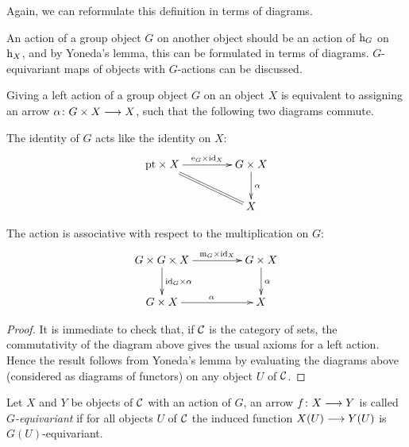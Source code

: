 \begin{2   CONTRAVARIANT FUNCTORS}
\begin{2.2 Group objects}
Again, we can reformulate this definition in terms of diagrams.
\begin{shaded}
An action of a group object $G$ on another object should be an action of $\mathrm{h}_G$ on $\mathrm{h}_X$, and by Yoneda's lemma, this can be formulated in terms of diagrams. $G$-equivariant maps of objects with $G$-actions can be discussed.
\end{shaded}

\begin{proposition}\label{prop:diagram-action}
Giving a left action of a group object $G$ on an object $X$ is equivalent to assigning an arrow $\alpha \colon G \times X \arr X$, such that the following two diagrams commute.

\begin{enumeratei}

\item The identity of $G$ acts like the identity on $X$:
   \[
   \xymatrix@C+20pt{
   {}\pt \times X\ar@{=}[rd]\ar[r]^-{\iden_G \times \id_X}&
   G\times X\ar[d]^{\alpha}\\
   &X
   }
   \]

\item The action is associative with respect to the multiplication
on $G$:
   \[
   \xymatrix@C+20pt{
   G \times G \times X
			\ar[r]^-{\mul_G \times\id_X}\ar[d]^{\id_G \times\alpha}&
   G \times X\ar[d]^{\alpha}\\
   G \times X\ar[r]^{\alpha}&
   X
   }
   \]

\end{enumeratei}
\end{proposition}

\begin{proof}
It is immediate to check that, if $\mathcal{C}$ is the category of sets, the commutativity of the diagram above gives the usual axioms for a left action. Hence the result follows from Yoneda's lemma by evaluating the diagrams above (considered as diagrams of functors) on any object $U$ of $\mathcal{C}$.
\end{proof}


\begin{definition}
Let $X$ and $Y$ be objects of $\mathcal{C}$ with an action of $G$, an arrow $f \colon X \arr Y$ is called \emph{$G$-equivariant}%
%
 if for all objects $U$ of $\mathcal{C}$ the  induced function $X(U) \arr Y(U)$ is $G(U)$-equivariant.
\end{definition}


\end{2.2 Group objects}
\end{2   CONTRAVARIANT FUNCTORS}
